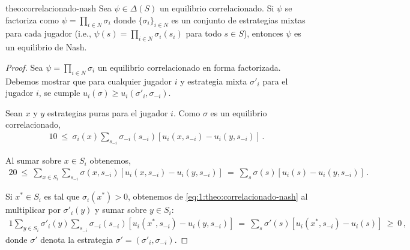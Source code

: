 \begin{reptheorem}{theo:correlacionado-nash}
Sea $\psi\in\Delta(S)$ un equilibrio correlacionado. Si $\psi$ se factoriza como $\psi=\prod_{i\in N} \sigma_i$ donde $\{\sigma_i\}_{i\in N}$ es un conjunto de estrategias mixtas para cada jugador (i.e., $\psi(s)=\prod_{i \in N} \sigma_i(s_i)$ para todo $s\in S$), entonces $\psi$ es un equilibrio de Nash.
\end{reptheorem}

\begin{proof}
Sea $\psi= \prod_{i \in N} \sigma_i$ un equilibrio correlacionado en forma factorizada. Debemos mostrar que para cualquier jugador $i$ y estrategia mixta $\sigma'_i$ para el jugador $i$, se cumple $u_i(\sigma) \geq u_i(\sigma'_i, \sigma_{-i})$.

Sean $x$ y $y$ estrategias puras para el jugador $i$.
Como $\sigma$ es un equilibrio correlacionado,
\begin{alignat}{1}
\label{eq:1:theo:correlacionado-nash}
0\ \leq\ \sigma_i(x) \sum_{s_{-i}} \sigma_{-i}(s_{-i})[u_i(x, s_{-i}) - u_i(y, s_{-i})] \,.
\end{alignat}

Al sumar sobre $x\in S_i$ obtenemos, 
\begin{alignat}{2}
\label{eq:2:theo:correlacionado-nash}
0\ \leq\ \sum_{x\in S_i} \sum_{s_{-i}} \sigma(x,s_{-i}) [u_i(x, s_{-i}) - u_i(y, s_{-i})]\ =\ \sum_s \sigma(s) [u_i(s) - u_i(y, s_{-i})] \,.
\end{alignat}

Si $x^* \in S_i$ es tal que $\sigma_i(x^*)>0$, obtenemos de \eqref{eq:1:theo:correlacionado-nash} al multiplicar por $\sigma'_i(y)$ y sumar sobre $y\in S_i$:
\begin{alignat}{1}
\label{eq:3:theo:correlacionado-nash}
\sum_{y \in S_i} \sigma'_i(y) \sum_{s_{-i}} \sigma_{-i} (s_{-i}) [u_i(x^*, s_{-i}) - u_i(y, s_{-i})]\ =\ \sum_{s} \sigma'(s) [u_i(x^*, s_{-i}) - u_i(s)]\ \geq\ 0 \,,
\end{alignat}
donde $\sigma'$ denota la estrategia $\sigma'=(\sigma'_i,\sigma_{-i})$. 


\end{proof}
